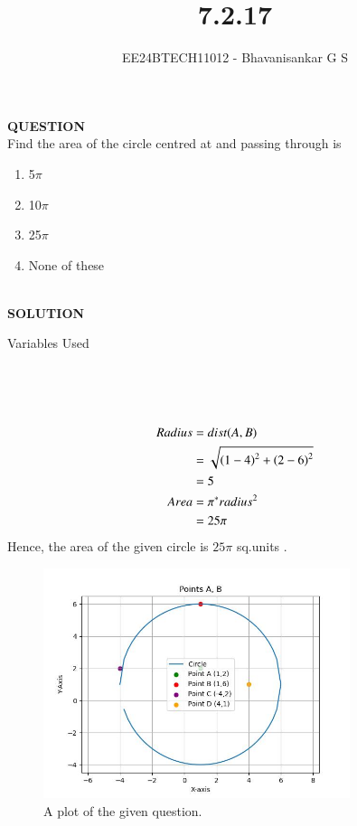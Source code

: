 \documentclass[journal]{IEEEtran}
\begin{document}

\vspace{3cm}

\title{7.2.17}
\author{EE24BTECH11012 - Bhavanisankar G S}
{\let\newpage\relax\maketitle}

\renewcommand{\thefigure}{\theenumi}
\renewcommand{\thetable}{\theenumi}
\setlength{\intextsep}{10pt} %


\renewcommand{\thetable}{\theenumi}

\textbf{QUESTION} \\
Find the area of the circle centred at  and passing through  is \\
\begin{enumerate}
    \item 5$\pi$ 
    \item 10$\pi$
    \item 25$\pi$
    \item None of these
\end{enumerate} \\
\textbf{SOLUTION} \\

\begin{table}[h!]
	\centering
        
	\caption{Variables Used}
	\label{tab7.2.17}
\end{table} \\ \\ \\

\begin{align}
	Radius &= dist(A,B) \\
	       &= \sqrt{\left(1-4\right)^2 + \left(2-6\right)^2} \\
	       &= 5 \\
	Area   &= \pi^*radius^2 \\ 
	       &= 25\pi \\
\end{align}
Hence, the area of the given circle is $ 25\pi $ sq.units .
	
\begin{figure}[h]
	\centering
	\includegraphics[width=0.8\textwidth]{figs/fig.jpg}
	\caption{A plot of the given question.}
\end{figure}
\end{document}
